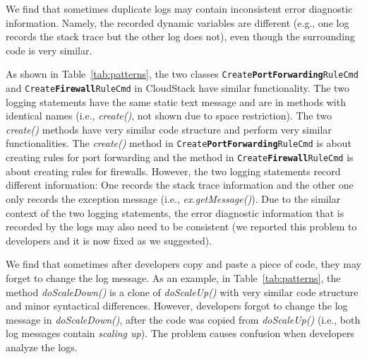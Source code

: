 
We find that sometimes duplicate logs may contain inconsistent error diagnostic information. Namely, the recorded dynamic variables are different (e.g., one log records the stack trace but the other log does not), even though the surrounding code is very similar. 

As shown in Table~\ref{tab:patterns}, the two classes {\tt\small Create\textbf{PortForwarding}RuleCmd} and {\tt\small Create\textbf{Firewall}RuleCmd} in CloudStack have similar functionality. The two logging statements have the same static text message and are in methods with identical names (i.e., {\em create()}, not shown due to space restriction). The two {\em create()} methods have very similar code structure and perform very similar functionalities. The {\em create()} method in {\tt\small Create\textbf{PortForwarding}RuleCmd} is about creating rules for port forwarding and the method in {\tt\small Create\textbf{Firewall}RuleCmd} is about creating rules for firewalls. However, the two logging statements record different information: One records the stack trace information and the other one only records the exception message (i.e., {\em ex.getMessage()}). Due to the similar context of the two logging statements, the error diagnostic information that is recorded by the logs may also need to be consistent (we reported this problem to developers and it is now fixed as we suggested). 









 We find that sometimes after developers copy and paste a piece of code, they may forget to change the log message. As an example, in Table~\ref{tab:patterns}, the method {\em doScaleDown()} is a clone of {\em doScaleUp()} with very similar code structure and minor syntactical differences. However, developers forgot to change the log message in {\em doScaleDown()}, after the code was copied from {\em doScaleUp()} (i.e., both log messages contain {\em scaling up}). The problem causes confusion when developers analyze the logs. 


